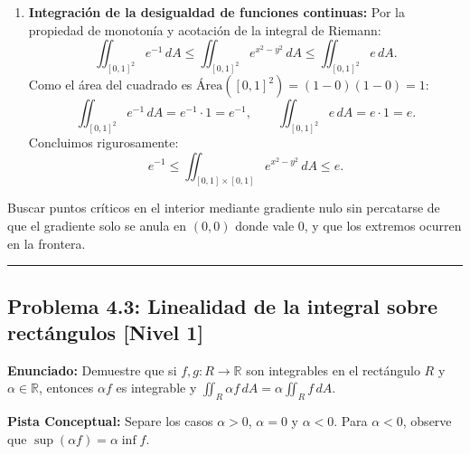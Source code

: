 \documentclass[11pt,a4paper]{article}
\begin{document}
\begin{enumerate}[label=\textbf{\arabic*.}]
\item \textbf{Integración de la desigualdad de funciones continuas:}
Por la propiedad de monotonía y acotación de la integral de Riemann:
\begin{equation*}
\iint_{[0,1]^2} e^{-1} \, dA \le \iint_{[0,1]^2} e^{x^2 - y^2} \, dA \le \iint_{[0,1]^2} e \, dA.
\end{equation*}
Como el área del cuadrado es $\text{Área}([0,1]^2) = (1 - 0)(1 - 0) = 1$:
\begin{equation*}
\iint_{[0,1]^2} e^{-1} \, dA = e^{-1} \cdot 1 = e^{-1}, \qquad \iint_{[0,1]^2} e \, dA = e \cdot 1 = e.
\end{equation*}
Concluimos rigurosamente:
\begin{equation*}
e^{-1} \le \iint_{[0,1] \times [0,1]} e^{x^2 - y^2} \, dA \le e.
\end{equation*}
\end{enumerate}

\begin{trapbox}
Buscar puntos críticos en el interior mediante gradiente nulo sin percatarse de que el gradiente solo se anula en $(0,0)$ donde vale 0, y que los extremos ocurren en la frontera.
\end{trapbox}

\vspace{0.5cm}
\hrule
\vspace{0.5cm}

\subsection*{Problema 4.3: Linealidad de la integral sobre rectángulos \hfill \color{primaryblue}\small[Nivel 1]}

\begin{tcolorbox}[colback=white,colframe=gray!40,arc=1mm,boxrule=0.5pt,left=3mm,right=3mm,top=2mm,bottom=2mm]
\textbf{Enunciado:} Demuestre que si $f, g: R \to \mathbb{R}$ son integrables en el rectángulo $R$ y $\alpha \in \mathbb{R}$, entonces $\alpha f$ es integrable y $\iint_R \alpha f \, dA = \alpha \iint_R f \, dA$.
\end{tcolorbox}

\begin{tcolorbox}[colback=yellow!4,colframe=accentamber!70,arc=1mm,boxrule=0.5pt,left=3mm,right=3mm,top=1.5mm,bottom=1.5mm]
\textbf{Pista Conceptual:} Separe los casos $\alpha > 0$, $\alpha = 0$ y $\alpha < 0$. Para $\alpha < 0$, observe que $\sup(\alpha f) = \alpha \inf f$.
\end{tcolorbox}
\end{document}
